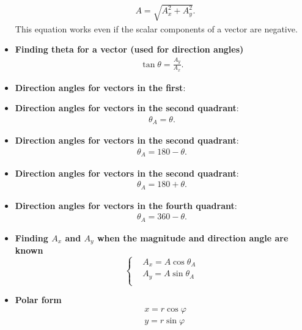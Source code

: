 \documentclass{report}
\begin{document}
\begin{itemize}
\begin{align*}
               &A = \sqrt{A_{x}^{2} + A_{y}^{2}}
            .\end{align*}
            This equation works even if the scalar components of a vector are negative.
        \item \textbf{Finding theta for a vector (used for direction angles)}
            \begin{align*}
                \tan{\theta } = \frac{A_{y}}{A_{x}}
            .\end{align*}
        \item \textbf{Direction angles for vectors in the first}:
        \item \textbf{Direction angles for vectors in the second quadrant}:
            \begin{align*}
                \theta_{A} = \theta 
            .\end{align*}
        \item \textbf{Direction angles for vectors in the second quadrant}:
            \begin{align*}
                \theta_{A} = 180 - \theta 
            .\end{align*}
        \item \textbf{Direction angles for vectors in the second quadrant}:
            \begin{align*}
                \theta_{A} = 180 + \theta 
            .\end{align*}
        \item \textbf{Direction angles for vectors in the fourth quadrant}:
            \begin{align*}
                \theta_{A} = 360 - \theta 
            .\end{align*}
        \item \textbf{Finding $A_{x}$ and $A_{y}$  when the magnitude and direction angle are known}
        \begin{equation}
            \begin{cases}
                &A_{x} = A\cos{\theta_{A}} \\
                &A_{y} = A\sin{\theta_{A}} \\
            \end{cases}
        \end{equation}
        \item \textbf{Polar form}
            \begin{align*}
                &x = r\cos{\varphi} \\
                &y = r\sin{\varphi}

\end{align*}
\end{itemize}
\end{document}

